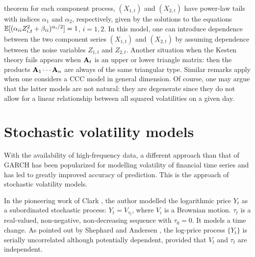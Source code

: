 theorem for each component process, $(X_{1,t})$ and $(X_{2,t})$ have
power-law tails  with indices $\alpha_1$ and $\alpha_2$, respectively,
given by the solutions to the equations  $\mathbb{E} [(\alpha_{ii}
Z_{i,t}^2+\beta_{ii})^{\alpha_i/2}]=1$, $i=1,2$. In this model, one
can introduce dependence between the two component series $(X_{1,t})$
and $(X_{2,t})$ by assuming dependence between the noise variables
$Z_{1,t}$ and $Z_{2,t}$. Another situation when the Kesten theory fails 
appears when ${\mathbf A}_t$ is an upper or lower triangle matrix: then the
products  ${\mathbf A}_1\cdots{\mathbf A}_n$ are always of the same triangular
type. 
Similar remarks apply when one considers a CCC model in general
dimension. Of course, one may argue that the latter models 
are not natural: they are degenerate since they do not allow 
for a linear relationship between all squared volatilities on a given
day.

\section{Stochastic volatility models}
\label{sec:SV:intro}
With the availability of high-frequency data, a different approach
than that of GARCH has been popularized for modelling volatility of
financial time series and has led to greatly improved accuracy of
prediction. This is the approach of stochastic volatility models.

In the pioneering work of Clark \cite{clark:1973}, the author modelled
the logarithmic price $Y_t$ as a subordinated stochastic process:
$Y_t = V_{\tau_t}$, where $V_i$ is a Brownian motion.
$\tau_t$ is a real-valued, non-negative, non-decreasing
sequence with $\tau_0 = 0$. It models a time change. As pointed out by
Shephard and Andersen \cite{Shephard:Andersen:2009}, the log-price
process $\{Y_t\}$ is serially uncorrelated although potentially dependent,
provided that $V_t$ and $\tau_t$ are independent.

